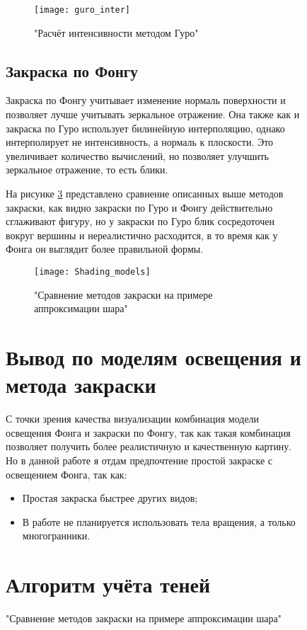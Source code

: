 \begin{figure}[h]
\begin{figure}[h]
	\centering
	\texttt{[image: guro\_inter]}
	\caption{"Расчёт интенсивности методом Гуро"}
	\label{fig:guro_inter}
\end{figure}

\subsection{Закраска по Фонгу}
Закраска по Фонгу учитывает изменение нормаль поверхности и позволяет лучше учитывать зеркальное отражение. Она также как и закраска по Гуро использует билинейную интерполяцию, однако интерполирует не интенсивность, а нормаль к плоскости. Это увеличивает количество вычислений, но позволяет улучшить зеркальное отражение, то есть блики.

На рисунке \ref{fig:shading} представлено сравнение описанных выше методов закраски, как видно закраски по Гуро и Фонгу действительно сглаживают фигуру, но у закраски по Гуро блик сосредоточен вокруг вершины и нереалистично расходится, в то время как у Фонга он выглядит более правильной формы.

\begin{figure}[h]
	\centering
	\texttt{[image: Shading\_models]}
	\caption{"Сравнение методов закраски на примере аппроксимации шара"}
	\label{fig:shading}
\end{figure}

\section{Вывод по моделям освещения и метода закраски}

С точки зрения качества визуализации комбинация модели освещения Фонга и закраски по Фонгу, так как такая комбинация позволяет получить более реалистичную и качественную картину. Но в данной работе я отдам предпочтение простой закраске с освещением Фонга, так как:
\begin{itemize}
	\item Простая закраска быстрее других видов;
	\item В работе не планируется использовать тела вращения, а только многогранники.
\end{itemize}




\section{Алгоритм учёта теней}


\end{figure}
